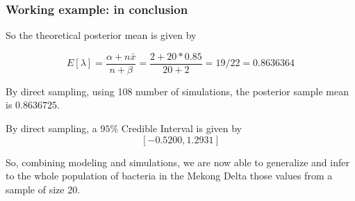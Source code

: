 \documentclass[border=5mm, convert, usenames, dvipsnames,beamer]{standalone}
\begin{document}
\begin{frame}[ fragile]{}
\frametitle{Working example: in conclusion}

\vspace{30}
\noindent
So the theoretical posterior mean is given by

$$
E[\lambda] =  \frac{\alpha + n \bar{x}}{n + \beta}  =  \frac{2 + 20 *0.85}{20 + 2} = 19/22 = 0.8636364
$$

\vspace{5}
\noindent
By direct sampling, using 108 number of simulations, the posterior sample mean is $0.8636725$. 

\vspace{5}
\noindent
By direct sampling, a $95\%$ Credible Interval is given by $$[−0.5200, 1.2931]$$

\vspace{10}
\noindent
So, combining modeling and simulations, we are now able to generalize and infer to the whole population of bacteria in the Mekong Delta those values from a sample of size 20.


\end{frame}








\end{document}
